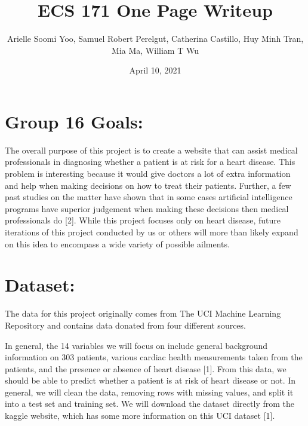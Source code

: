 \documentclass[12pt]{article}
\title{\normalsize ECS 171 One Page Writeup}
\author{\small Arielle Soomi Yoo, Samuel Robert Perelgut, Catherina Castillo, Huy Minh Tran, Mia Ma, William T Wu }
\date{April 10, 2021}
\begin{document}
\titlespacing*{\section}{0pt}{0.25cm}{0.25cm}
\titlespacing*{\subsection}{0pt}{0.5cm}{0.5cm}

\maketitle

\section*{\normalsize Group 16 Goals: }

The overall purpose of this project is to create a website that can assist 
medical professionals in diagnosing whether a patient is at risk for a heart 
disease. This problem is interesting because it would give doctors a lot of 
extra information and help when making decisions on how to treat their 
patients. Further, a few past studies on the matter have shown that in some 
cases artificial intelligence programs have superior judgement when making 
these decisions then medical professionals do [2]. While this project focuses 
only on heart disease, future iterations of this project conducted by us or 
others will more than likely expand on this idea to encompass a wide variety 
of possible ailments.

\section*{\normalsize Dataset: }

The data for this project originally comes from The UCI Machine Learning 
Repository and contains data donated from four different sources.

In general, the 14 variables we will focus on include general background 
information on 303 patients, various cardiac health measurements taken 
from the patients, and the presence or absence of heart disease [1]. 
From this data, we should be able to predict whether a patient is at risk of 
heart disease or not. In general, we will clean the data, removing rows with 
missing values, and split it into a test set and training set. We will 
download the dataset directly from the kaggle website, which has some more 
information on this UCI dataset [1].
\end{document}
